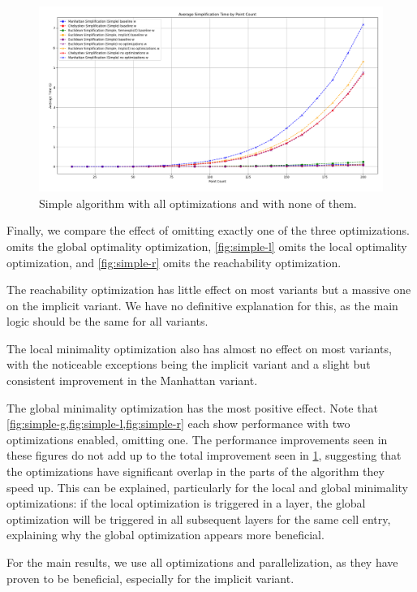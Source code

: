 \begin{figure}[b]
  \centering
	\includegraphics[scale=0.4]{./figures/simple-noopt.png}
  \caption{Simple algorithm with all optimizations and with none of them.}
  \label{fig:simple-noopt}
\end{figure}

Finally, we compare the effect of omitting exactly one of the three optimizations.  omits the global optimality optimization, \cref{fig:simple-l} omits the local optimality optimization, and \cref{fig:simple-r} omits the reachability optimization.

The reachability optimization has little effect on most variants but a massive one on the implicit variant. We have no definitive explanation for this, as the main logic should be the same for all variants.

The local minimality optimization also has almost no effect on most variants, with the noticeable exceptions being the implicit variant and a slight but consistent improvement in the Manhattan variant.

The global minimality optimization has the most positive effect. Note that \cref{fig:simple-g,fig:simple-l,fig:simple-r} each show performance with two optimizations enabled, omitting one. The performance improvements seen in these figures do not add up to the total improvement seen in \cref{fig:simple-noopt}, suggesting that the optimizations have significant overlap in the parts of the algorithm they speed up. This can be explained, particularly for the local and global minimality optimizations: if the local optimization is triggered in a layer, the global optimization will be triggered in all subsequent layers for the same cell entry, explaining why the global optimization appears more beneficial.

For the main results, we use all optimizations and parallelization, as they have proven to be beneficial, especially for the implicit variant.

